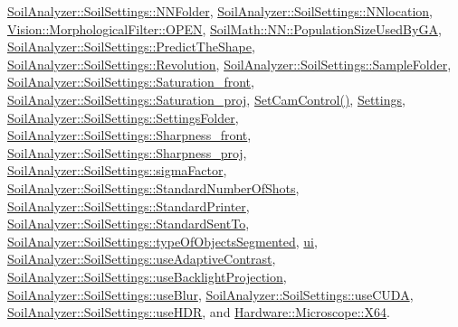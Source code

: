 \hyperlink{soilsettings_8h_source_l00100}{Soil\+Analyzer\+::\+Soil\+Settings\+::\+N\+N\+Folder}, \hyperlink{soilsettings_8h_source_l00095}{Soil\+Analyzer\+::\+Soil\+Settings\+::\+N\+Nlocation}, \hyperlink{_morphological_filter_8h_source_l00016}{Vision\+::\+Morphological\+Filter\+::\+O\+P\+E\+N}, \hyperlink{_n_n_8h_source_l00133}{Soil\+Math\+::\+N\+N\+::\+Population\+Size\+Used\+By\+G\+A}, \hyperlink{soilsettings_8h_source_l00104}{Soil\+Analyzer\+::\+Soil\+Settings\+::\+Predict\+The\+Shape}, \hyperlink{soilsettings_8h_source_l00105}{Soil\+Analyzer\+::\+Soil\+Settings\+::\+Revolution}, \hyperlink{soilsettings_8h_source_l00098}{Soil\+Analyzer\+::\+Soil\+Settings\+::\+Sample\+Folder}, \hyperlink{soilsettings_8h_source_l00079}{Soil\+Analyzer\+::\+Soil\+Settings\+::\+Saturation\+\_\+front}, \hyperlink{soilsettings_8h_source_l00080}{Soil\+Analyzer\+::\+Soil\+Settings\+::\+Saturation\+\_\+proj}, \hyperlink{dialogsettings_8cpp_source_l00262}{Set\+Cam\+Control()}, \hyperlink{dialogsettings_8h_source_l00020}{Settings}, \hyperlink{soilsettings_8h_source_l00099}{Soil\+Analyzer\+::\+Soil\+Settings\+::\+Settings\+Folder}, \hyperlink{soilsettings_8h_source_l00089}{Soil\+Analyzer\+::\+Soil\+Settings\+::\+Sharpness\+\_\+front}, \hyperlink{soilsettings_8h_source_l00090}{Soil\+Analyzer\+::\+Soil\+Settings\+::\+Sharpness\+\_\+proj}, \hyperlink{soilsettings_8h_source_l00056}{Soil\+Analyzer\+::\+Soil\+Settings\+::sigma\+Factor}, \hyperlink{soilsettings_8h_source_l00103}{Soil\+Analyzer\+::\+Soil\+Settings\+::\+Standard\+Number\+Of\+Shots}, \hyperlink{soilsettings_8h_source_l00102}{Soil\+Analyzer\+::\+Soil\+Settings\+::\+Standard\+Printer}, \hyperlink{soilsettings_8h_source_l00101}{Soil\+Analyzer\+::\+Soil\+Settings\+::\+Standard\+Sent\+To}, \hyperlink{soilsettings_8h_source_l00051}{Soil\+Analyzer\+::\+Soil\+Settings\+::type\+Of\+Objects\+Segmented}, \hyperlink{dialogsettings_8h_source_l00133}{ui}, \hyperlink{soilsettings_8h_source_l00040}{Soil\+Analyzer\+::\+Soil\+Settings\+::use\+Adaptive\+Contrast}, \hyperlink{soilsettings_8h_source_l00072}{Soil\+Analyzer\+::\+Soil\+Settings\+::use\+Backlight\+Projection}, \hyperlink{soilsettings_8h_source_l00048}{Soil\+Analyzer\+::\+Soil\+Settings\+::use\+Blur}, \hyperlink{soilsettings_8h_source_l00096}{Soil\+Analyzer\+::\+Soil\+Settings\+::use\+C\+U\+D\+A}, \hyperlink{soilsettings_8h_source_l00073}{Soil\+Analyzer\+::\+Soil\+Settings\+::use\+H\+D\+R}, and \hyperlink{_microscope_8h_source_l00053}{Hardware\+::\+Microscope\+::\+X64}.



